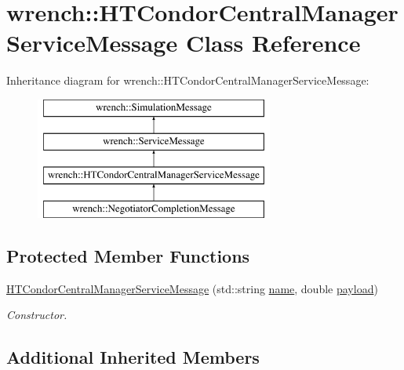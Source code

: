 \hypertarget{classwrench_1_1_h_t_condor_central_manager_service_message}{}\section{wrench\+:\+:H\+T\+Condor\+Central\+Manager\+Service\+Message Class Reference}
\label{classwrench_1_1_h_t_condor_central_manager_service_message}
Inheritance diagram for wrench\+:\+:H\+T\+Condor\+Central\+Manager\+Service\+Message\+:\begin{figure}[H]
\begin{center}
\leavevmode
\includegraphics[height=4.000000cm]{classwrench_1_1_h_t_condor_central_manager_service_message}
\end{center}
\end{figure}
\subsection*{Protected Member Functions}
\begin{DoxyCompactItemize}
\item 
\hyperlink{classwrench_1_1_h_t_condor_central_manager_service_message_a18405b39184680404710905465d3a573}{H\+T\+Condor\+Central\+Manager\+Service\+Message} (std\+::string \hyperlink{classwrench_1_1_simulation_message_ab224f6dd8ec5ee2e7f65bfcdf2b8a86b}{name}, double \hyperlink{classwrench_1_1_simulation_message_a914f2732713f7c02898e66f05a7cb8a1}{payload})
\begin{DoxyCompactList}\small\item\em Constructor. \end{DoxyCompactList}\end{DoxyCompactItemize}
\subsection*{Additional Inherited Members}


